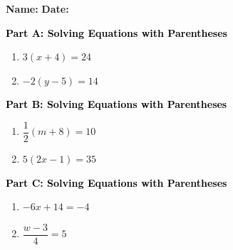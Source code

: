 \documentclass[12pt, letterpaper, fleqn]{article}
\begin{document}
\textbf{Name:} \underline{\hspace{5cm}}
\hfill
\textbf{Date:} \underline{\hspace{3cm}}\\

\begin{tcolorbox}[colback=customteal!20]
\large\textcolor{black}{\textbf{Part A: Solving Equations with Parentheses}}
\end{tcolorbox}

\vspace{3mm}

\begin{enumerate}[itemsep=2.5cm, leftmargin=0.6cm]
\item $3(x + 4) = 24$
\item $-2(y - 5) = 14$
\end{enumerate}

\newpage

\begin{tcolorbox}[colback=customteal!20]
\large\textcolor{black}{\textbf{Part B: Solving Equations with Parentheses}}
\end{tcolorbox}

\vspace{3mm}

\begin{enumerate}[itemsep=2.5cm, leftmargin=0.6cm, resume]
\item $\dfrac{1}{2}(m + 8) = 10$
\item $5(2x - 1) = 35$
\end{enumerate}

\newpage

\begin{tcolorbox}[colback=customteal!20]
\large\textcolor{black}{\textbf{Part C: Solving Equations with Parentheses}}
\end{tcolorbox}

\vspace{3mm}

\begin{enumerate}[itemsep=2.5cm, leftmargin=0.6cm, resume]
\item $-6x + 14 = -4$
\item $\dfrac{w - 3}{4} = 5$
\end{enumerate}

\newpage
\end{document}
